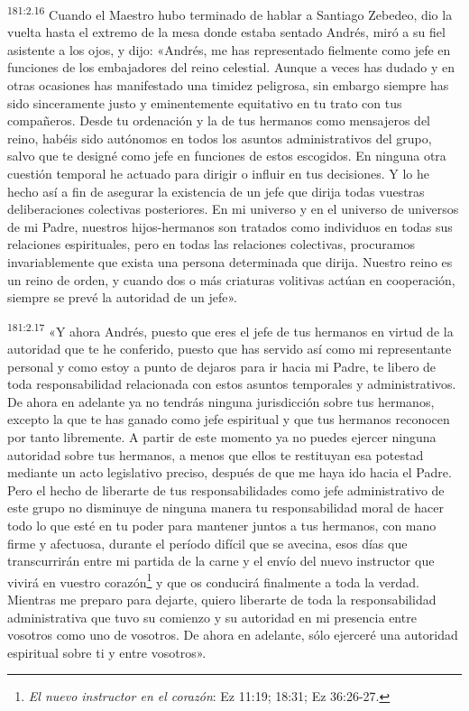 \par 
\textsuperscript{181:2.16} Cuando el Maestro hubo terminado de hablar a Santiago Zebedeo, dio la vuelta hasta el extremo de la mesa donde estaba sentado Andrés, miró a su fiel asistente a los ojos, y dijo: «Andrés, me has representado fielmente como jefe en funciones de los embajadores del reino celestial. Aunque a veces has dudado y en otras ocasiones has manifestado una timidez peligrosa, sin embargo siempre has sido sinceramente justo y eminentemente equitativo en tu trato con tus compañeros. Desde tu ordenación y la de tus hermanos como mensajeros del reino, habéis sido autónomos en todos los asuntos administrativos del grupo, salvo que te designé como jefe en funciones de estos escogidos. En ninguna otra cuestión temporal he actuado para dirigir o influir en tus decisiones. Y lo he hecho así a fin de asegurar la existencia de un jefe que dirija todas vuestras deliberaciones colectivas posteriores. En mi universo y en el universo de universos de mi Padre, nuestros hijos-hermanos son tratados como individuos en todas sus relaciones espirituales, pero en todas las relaciones colectivas, procuramos invariablemente que exista una persona determinada que dirija. Nuestro reino es un reino de orden, y cuando dos o más criaturas volitivas actúan en cooperación, siempre se prevé la autoridad de un jefe».

\par 
\textsuperscript{181:2.17} «Y ahora Andrés, puesto que eres el jefe de tus hermanos en virtud de la autoridad que te he conferido, puesto que has servido así como mi representante personal y como estoy a punto de dejaros para ir hacia mi Padre, te libero de toda responsabilidad relacionada con estos asuntos temporales y administrativos. De ahora en adelante ya no tendrás ninguna jurisdicción sobre tus hermanos, excepto la que te has ganado como jefe espiritual y que tus hermanos reconocen por tanto libremente. A partir de este momento ya no puedes ejercer ninguna autoridad sobre tus hermanos, a menos que ellos te restituyan esa potestad mediante un acto legislativo preciso, después de que me haya ido hacia el Padre. Pero el hecho de liberarte de tus responsabilidades como jefe administrativo de este grupo no disminuye de ninguna manera tu responsabilidad moral de hacer todo lo que esté en tu poder para mantener juntos a tus hermanos, con mano firme y afectuosa, durante el período difícil que se avecina, esos días que transcurrirán entre mi partida de la carne y el envío del nuevo instructor que vivirá en vuestro corazón\footnote{\textit{El nuevo instructor en el corazón}: Ez 11:19; 18:31; Ez 36:26-27.} y que os conducirá finalmente a toda la verdad. Mientras me preparo para dejarte, quiero liberarte de toda la responsabilidad administrativa que tuvo su comienzo y su autoridad en mi presencia entre vosotros como uno de vosotros. De ahora en adelante, sólo ejerceré una autoridad espiritual sobre ti y entre vosotros».

